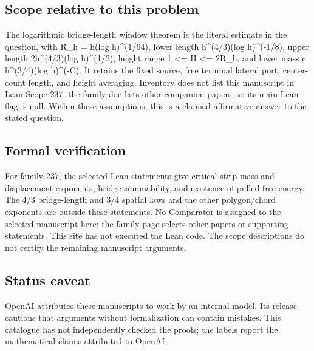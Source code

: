 \documentclass[11pt]{article}
\begin{document}
\subsection{Scope relative to this problem}
The logarithmic bridge-length window theorem is the literal estimate in the question, with R\_h = h(log h)\textasciicircum{}(1/64), lower length h\textasciicircum{}(4/3)(log h)\textasciicircum{}(-1/8), upper length 2h\textasciicircum{}(4/3)(log h)\textasciicircum{}(1/2), height range 1 <= H <= 2R\_h, and lower mass c h\textasciicircum{}(3/4)(log h)\textasciicircum{}(-C). It retains the fixed source, free terminal lateral port, center-count length, and height averaging. Inventory does not list this manuscript in Lean Scope 237; the family doc lists other companion papers, so its main Lean flag is null. Within these assumptions, this is a claimed affirmative answer to the stated question.

\subsection{Formal verification}
For family 237, the selected Lean statements give critical-strip mass and displacement exponents, bridge summability, and existence of pulled free energy. The $4/3$ bridge-length and $3/4$ spatial laws and the other polygon/chord exponents are outside these statements. No Comparator is assigned to the selected manuscript here; the family page selects other papers or supporting statements. This site has not executed the Lean code. The scope descriptions do not certify the remaining manuscript arguments.

\subsection{Status caveat}
OpenAI attributes these manuscripts to work by an internal model. Its release cautions that arguments without formalization can contain mistakes. This catalogue has not independently checked the proofs; the labels report the mathematical claims attributed to OpenAI.
\end{document}
